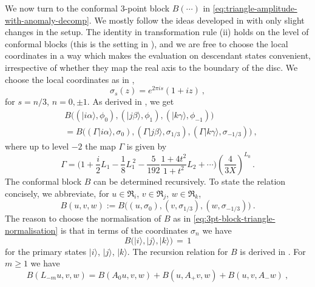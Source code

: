 \documentclass[11pt,a4paper]{article}
\numberwithin{equation}{section}
\begin{document}
\smallskip
We now turn to the conformal 3-point block $B(\cdots)$ in \eqref{eq:triangle-amplitude-with-anomaly-decomp}. We mostly follow the ideas developed in \cite{Brehm:2021wev} with only slight changes in the setup.
The identity in transformation rule (ii) holds on the level of conformal blocks (this is the setting in \cite[Sec.\,5]{Frenkel:2004}), and we are free to choose the local coordinates in a way which makes the evaluation on descendant states convenient, irrespective of whether they map the real axis to the boundary of the disc. We choose the local coordinates as in \cite[Eqn.\,(6.32)]{Brehm:2021wev},
\begin{equation}
    \sigma_s(z) = e^{2 \pi i s} (1 + i z)\ ,
\end{equation}
for $s = n/3$, $n=0,\pm 1$. As derived in \cite[Sec.\,6.2.2]{Brehm:2021wev}, we get
\begin{align}
&    B\big( (|i\alpha\rangle,\phi_0) , (|j\beta\rangle,\phi_1) ,  (|k\gamma\rangle,\phi_{-1}) \big)
\nonumber \\    
&    =
    B\big( (\Gamma |i\alpha\rangle,\sigma_0) , (\Gamma |j\beta\rangle,\sigma_{1/3}) ,  (\Gamma  |k\gamma\rangle,\sigma_{-1/3}) \big) \ ,
\end{align}
where up to level $-2$ the map $\Gamma$ is given by 
\begin{equation}\label{eq:Gamma-for-clipped-triang}
    \Gamma = \Big(1 + \frac{i}{2} L_1 - \frac{1}{8} L_1^{\,2} - \frac{5}{192} \frac{1+4t^2}{1+t^2} L_2
 + \cdots\Big)
    \left(\frac{4}{3X}\right)^{\!L_0}
\,.
\end{equation}
The conformal block $B$ can be determined recursively. To state the relation concisely, we abbreviate, for $u \in \mathfrak{R}_i$, $v \in \mathfrak{R}_j$, $w \in \mathfrak{R}_k$,
\begin{equation}
    B(u,v,w) := 
B\big( (u,\sigma_0) , (v,\sigma_{1/3}) ,  (w,\sigma_{-1/3}) \big) \ .
\end{equation}
%
The reason to choose the normalisation of $B$ as in \eqref{eq:3pt-block-triangle-normalisation} is that in terms of the coordinates $\sigma_n$ we have
\begin{equation}\label{eq:tilde-B-norm}
 B\big(|i\rangle,|j\rangle,|k\rangle\big) \,=\, 1 
\end{equation}
for the  primary states $|i\rangle$, $|j\rangle$, $|k\rangle$.
The recursion relation for $B$ is
derived in \cite[Sec.\,6.3.3]{Brehm:2021wev}. For $m \ge 1$ we have
%
\begin{equation}\label{eq:recusive-relation}
B(L_{-m} u,v,w)
 = 
B(A_0 u,v,w)
+
B(u,A_+ v,w)
+
B(u,v,A_- w)~,
\end{equation}
\end{document}
